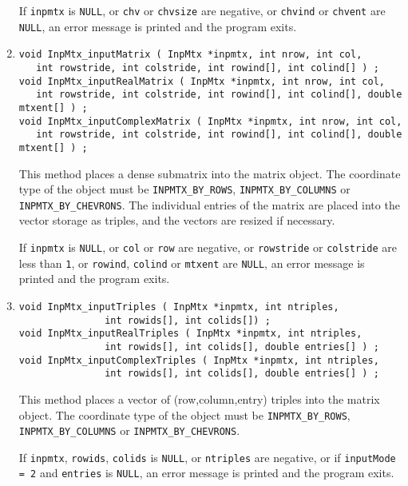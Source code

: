\begin{enumerate}
\par {}
If {\tt inpmtx} is {\tt NULL}, or {\tt chv} or {\tt chvsize} 
are negative, or {\tt chvind} or {\tt chvent} are {\tt NULL},
an error message is printed and the program exits.
\item
\begin{verbatim}
void InpMtx_inputMatrix ( InpMtx *inpmtx, int nrow, int col, 
   int rowstride, int colstride, int rowind[], int colind[] ) ;
void InpMtx_inputRealMatrix ( InpMtx *inpmtx, int nrow, int col, 
   int rowstride, int colstride, int rowind[], int colind[], double mtxent[] ) ;
void InpMtx_inputComplexMatrix ( InpMtx *inpmtx, int nrow, int col, 
   int rowstride, int colstride, int rowind[], int colind[], double mtxent[] ) ;
\end{verbatim}
This method places a dense submatrix into the matrix object.
The coordinate type of the object must be 
{\tt INPMTX\_BY\_ROWS}, {\tt INPMTX\_BY\_COLUMNS} 
or {\tt INPMTX\_BY\_CHEVRONS}.
The individual entries of the matrix are placed into the vector
storage as triples, and the vectors are resized if necessary.
\par {}
If {\tt inpmtx} is {\tt NULL}, 
or {\tt col} or {\tt row} are negative, 
or {\tt rowstride} or {\tt colstride} are less than {\tt 1},
or {\tt rowind}, {\tt colind} or {\tt mtxent} are {\tt NULL},
an error message is printed and the program exits.
\item
\begin{verbatim}
void InpMtx_inputTriples ( InpMtx *inpmtx, int ntriples, 
               int rowids[], int colids[]) ;
void InpMtx_inputRealTriples ( InpMtx *inpmtx, int ntriples, 
               int rowids[], int colids[], double entries[] ) ;
void InpMtx_inputComplexTriples ( InpMtx *inpmtx, int ntriples, 
               int rowids[], int colids[], double entries[] ) ;
\end{verbatim}
This method places a vector of (row,column,entry) triples 
into the matrix object.
The coordinate type of the object must be 
{\tt INPMTX\_BY\_ROWS}, {\tt INPMTX\_BY\_COLUMNS} 
or {\tt INPMTX\_BY\_CHEVRONS}.
\par {}
If {\tt inpmtx}, {\tt rowids}, {\tt colids} is {\tt NULL},
or {\tt ntriples} are negative,
or if {\tt inputMode = 2} and {\tt entries} is {\tt NULL},
an error message is printed and the program exits.
\end{enumerate}
\par
